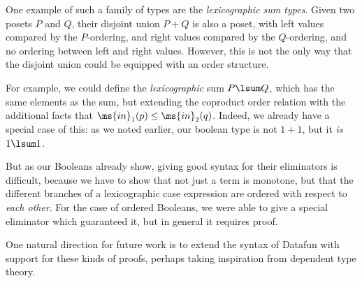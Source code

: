 One example of such a family of types are the \emph{lexicographic sum
  types}. Given two posets $P$ and $Q$, their disjoint union $P + Q$
is also a poset, with left values compared by the $P$-ordering, and
right values compared by the $Q$-ordering, and no ordering between
left and right values. However, this is not the only way that the
disjoint union could be equipped with an order structure.

For example, we could define the \emph{lexicographic} sum $P \lsum Q$,
which has the same elements as the sum, but extending the coproduct order
relation with the additional facts that $\ms{in}_1(p) \leq \ms{in}_2(q)$.
Indeed, we already have a special case of this: as we noted earlier, our boolean
type is not $1 + 1$, but it \emph{is} $1 \lsum 1$.

But as our Booleans already show, giving good syntax for their
eliminators is difficult, because we have to show that not just a term
is monotone, but that the different branches of a lexicographic case
expression are ordered with respect to \emph{each other}. For the case
of ordered Booleans, we were able to give a special eliminator which
guaranteed it, but in general it requires proof.

One natural direction for future work is to extend the syntax of
Datafun with support for these kinds of proofs, perhaps taking
inspiration from dependent type theory.
